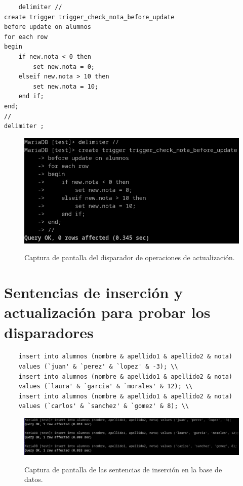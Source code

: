 \documentclass{article}
\begin{document}
\begin{lstlisting}
    delimiter //
create trigger trigger_check_nota_before_update
before update on alumnos
for each row
begin
    if new.nota < 0 then
        set new.nota = 0;
    elseif new.nota > 10 then
        set new.nota = 10;
    end if;
end;
//
delimiter ;
\end{lstlisting}
\begin{figure}[ht]
    \centering
    {
        \includegraphics[width=\linewidth]{03screenshot.png} %
    }
    \caption{Captura de pantalla del disparador de operaciones de actualización.}
\end{figure}

\newpage %

\section*{Sentencias de inserción y actualización para probar los disparadores}
\begin{lstlisting}
	insert into alumnos (nombre & apellido1 & apellido2 & nota) 
    values (`juan' & `perez' & `lopez' & -3); \\
	insert into alumnos (nombre & apellido1 & apellido2 & nota) 
    values (`laura' & `garcia' & `morales' & 12); \\
	insert into alumnos (nombre & apellido1 & apellido2 & nota) 
    values (`carlos' & `sanchez' & `gomez' & 8); \\
\end{lstlisting}
\begin{figure}[ht]
    \centering
    {
        \includegraphics[width=\linewidth]{04screenshot.png} %
    }
    \caption{Captura de pantalla de las sentencias de inserción en la base de datos.}
\end{figure}
\end{document}
